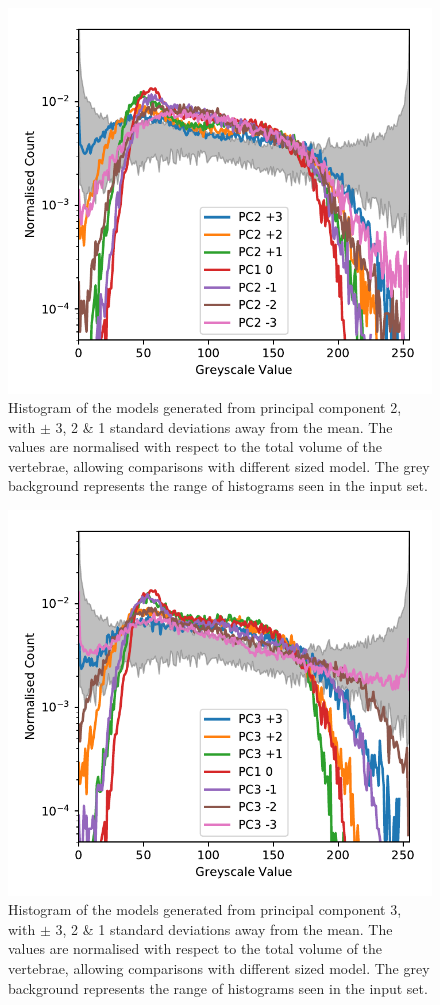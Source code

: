 \begin{figure}[h!]
  \centering
  \includegraphics[width=.65\textwidth]{Chapters/Chapter_PCA_images/pca2_histo.pdf}
  \caption{Histogram of the models generated from principal component 2, with $\pm$ 3, 2 \& 1 standard deviations away from the mean. The values are normalised with respect to the total volume of the vertebrae, allowing comparisons with different sized model. The grey background represents the range of histograms seen in the input set.}
  \label{fig:pca2_histo}
\end{figure}

\begin{figure}[h!]
  \centering
  \includegraphics[width=.65\textwidth]{Chapters/Chapter_PCA_images/pca3_histo.pdf}
  \caption{Histogram of the models generated from principal component 3, with $\pm$ 3, 2 \& 1 standard deviations away from the mean. The values are normalised with respect to the total volume of the vertebrae, allowing comparisons with different sized model. The grey background represents the range of histograms seen in the input set.}
  \label{fig:pca3_histo}
\end{figure}

